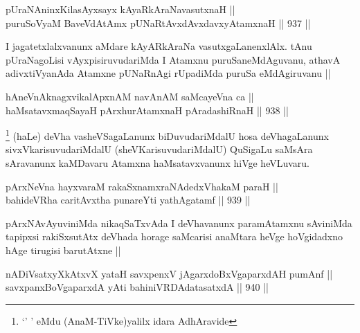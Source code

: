 
\begin{shl}
pUraNAninxKilasAyxsayx kAyaRkAraNavasutxnaH || \\
puruSoV\s yaM BaveVdAtAmx pUNaRtAvxdAvx\s davxyAtamxnaH ||  937 ||  
\end{shl}

\begin{artha}
I jagatetxlalxvanunx aMdare kAyARkAraNa vasutxgaLanenxlAlx. tAnu pUraNagoLisi vAyxpisiruvudariMda I Atamxnu puruSaneMdAguvanu, athavA adivxtiVyanAda Atamxne pUNaRnAgi rUpadiMda puruSa eMdAgiruvanu ||
\end{artha}


\begin{shl}
hAneVnAknagxvikalApxnAM navAnAM saMcayeVna ca || \\
haMsatavxmaqSayaH pArxhurAtamxnaH pAradashiRnaH ||  938 ||  
\end{shl}

\begin{artha}
\footnote{`\stext' \stext' eMdu (AnaM-TiVke)yalilx idara AdhAravide}
(haLe) deVha vasheVSagaLanunx biDuvudariMdalU hosa deVhagaLanunx sivxVkarisuvudariMdalU (sheVKarisuvudariMdalU) QuSigaLu saMsAra sAravanunx kaMDavaru Atamxna haMsatavxvanunx hiVge heVLuvaru.
\end{artha}


\begin{shl}
pArxNeVna hayxvaraM rakaSxnamxraNAdedxVhakaM paraH || \\
bahideVRha caritAvx\s tha punareYti yathAgatamf ||  939 ||  
\end{shl}

\begin{artha}
pArxNAvAyuviniMda nikaqSaTxvAda I deVhavanunx paramAtamxnu sAviniMda tapipxsi rakiSxsutAtx deVhada horage saMcarisi anaMtara heVge hoVgidadxno hAge tirugisi barutAtxne ||
\end{artha}


\begin{shl}
nADiVsatxyXkAtxvX yataH savxpenxV jAgarxdoBxVgaparxdAH pumAnf ||  \\
savxpanxBoVgaparxdA yAti bahiniVRDAdatasatxdA ||  940 ||  
\end{shl}

